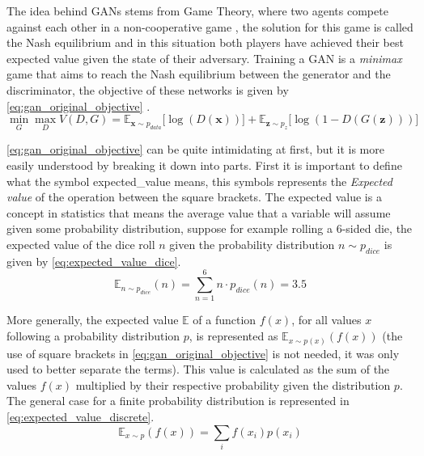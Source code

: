 The idea behind \acp{GAN} stems from Game Theory, where two agents compete against each other in a non-cooperative game \cite{improvedGANS2016}, the solution for this game is called the Nash equilibrium and in this situation both players have achieved their best expected value given the state of their adversary. Training a \gls{GAN} is a \textit{minimax} game that aims to reach the Nash equilibrium between the generator and the discriminator, the objective of these networks is given by \autoref{eq:gan_original_objective} \cite{gans2014}.
\begin{equation} \label{eq:gan_original_objective}
    \min_{G} \max_{D} V(D,G) =
    \mathbb{E}_{\bm{x}\sim p_{data}}\bigl\lbrack \log(D(\bm{x})) \bigr\rbrack + 
    \mathbb{E}_{\bm{z}\sim p_{z}}\bigl\lbrack \log(1 - D(G(\bm{z}))) \bigr\rbrack
\end{equation}

\autoref{eq:gan_original_objective} can be quite intimidating at first, but it is more easily understood by breaking it down into parts. First it is important to define what the symbol \gls{expected_value} means, this symbols represents the \textit{Expected value} of the operation between the square brackets. The expected value is a concept in statistics that means the average value that a variable will assume given some probability distribution, suppose for example rolling a 6-sided die, the expected value of the dice roll $n$ given the probability distribution $n\sim p_{dice}$ is given by \autoref{eq:expected_value_dice}.
\begin{equation} \label{eq:expected_value_dice}
    \mathbb{E}_{n\sim p_{dice}}(n) = \sum_{n=1}^{6}{n \cdot p_{dice}(n)} = 3.5
\end{equation}

More generally, the expected value $\mathbb{E}$ of a function $f(x)$, for all values $x$ following a probability distribution $p$, is represented as $\mathbb{E}_{x\sim p(x)}(f(x))$ (the use of square brackets in \autoref{eq:gan_original_objective} is not needed, it was only used to better separate the terms). This value is calculated as the sum of the values $f(x)$ multiplied by their respective probability given the distribution $p$. The general case for a finite probability distribution is represented in \autoref{eq:expected_value_discrete}.
\begin{equation} \label{eq:expected_value_discrete}
    \mathbb{E}_{x\sim p}\left( f(x) \right) = \sum_{i}{f(x_i) p(x_i)}
\end{equation}

